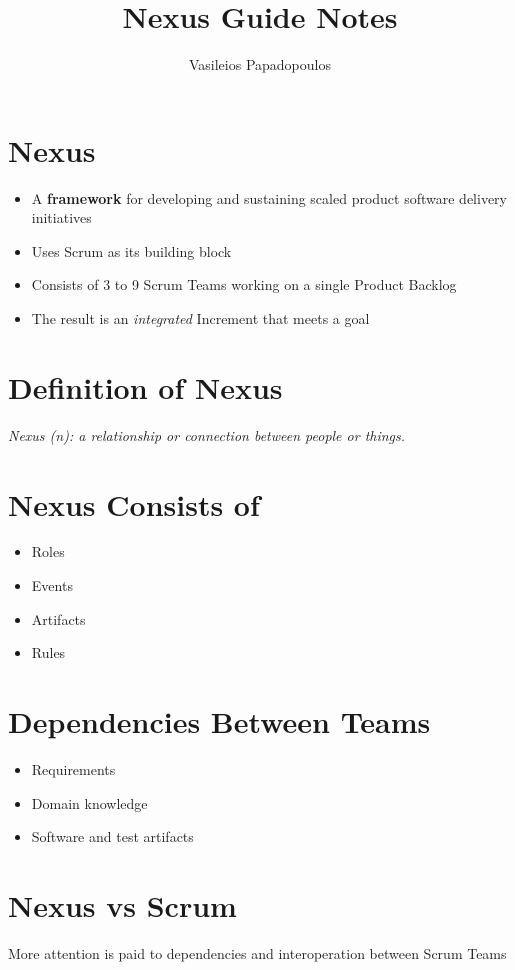 \documentclass[a4paper,11pt,twocolumn]{article}
\title{\textbf{Nexus Guide Notes} \vspace{-2ex}}
\author{Vasileios Papadopoulos}
\date{}
\begin{document}
\maketitle

\thispagestyle{fancy}

\section*{Nexus}
\begin{itemize}
	\item A \textbf{framework} for developing and sustaining scaled product software delivery initiatives
	\item Uses Scrum as its building block
	\item Consists of 3 to 9 Scrum Teams working on a single Product Backlog
	\item The result is an \textit{integrated} Increment that meets a goal
\end{itemize}

\section*{Definition of Nexus}
\textit{Nexus (n): a relationship or connection between people or things.}

\section*{Nexus Consists of}
\begin{itemize}
	\item Roles
	\item Events
	\item Artifacts
	\item Rules
\end{itemize}

\section*{Dependencies Between Teams}
\begin{itemize}
	\item Requirements
	\item Domain knowledge
	\item Software and test artifacts
\end{itemize}

\section*{Nexus vs Scrum}
More attention is paid to dependencies and interoperation between Scrum Teams
\end{document}

